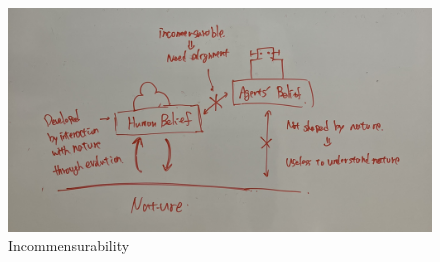 
\begin{figure}[htb]
    \centering
    \includegraphics[width=\linewidth]{figs/incommensurability.jpg}
    \caption{Incommensurability}
    \label{fig:incommensurability}
\end{figure}


